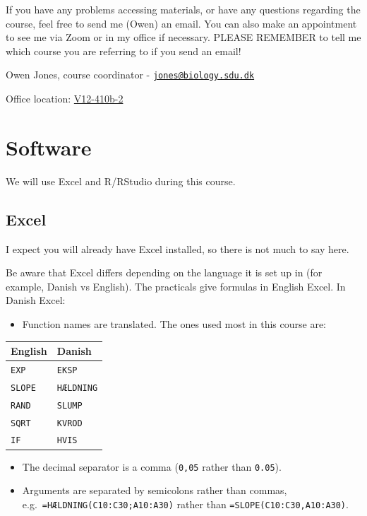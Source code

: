 \documentclass[
  a4paper]{book}
\newcounter{none} %
\providecommand{\tightlist}{%
  \setlength{\itemsep}{0pt}\setlength{\parskip}{0pt}}
\begin{document}
If you have any problems accessing materials, or have any questions regarding the course, feel free to send me (Owen) an email. You can also make an appointment to see me via Zoom or in my office if necessary. PLEASE REMEMBER to tell me which course you are referring to if you send an email!

Owen Jones, course coordinator - \href{mailto:jones@biology.sdu.dk}{\nolinkurl{jones@biology.sdu.dk}}

Office location: \href{https://clients.mapsindoors.com/sdu/573f26e4bc1f571b08094312/details/563cb94f423b7d0540c9a605}{V12-410b-2}

\section{Software}\label{software}

We will use Excel and R/RStudio during this course.

\subsection{Excel}\label{excel}

I expect you will already have Excel installed, so there is not much to say here.

Be aware that Excel differs depending on the language it is set up in (for example, Danish vs English). The practicals give formulas in English Excel. In Danish Excel:

\begin{itemize}
\tightlist
\item
  Function names are translated. The ones used most in this course are:
\end{itemize}

{\def\LTcaptype{none} %
\begin{longtable}[]{@{}ll@{}}
\toprule\noalign{}
English & Danish \\
\midrule\noalign{}
\endhead
\bottomrule\noalign{}
\endlastfoot
\texttt{EXP} & \texttt{EKSP} \\
\texttt{SLOPE} & \texttt{HÆLDNING} \\
\texttt{RAND} & \texttt{SLUMP} \\
\texttt{SQRT} & \texttt{KVROD} \\
\texttt{IF} & \texttt{HVIS} \\
\end{longtable}
}

\begin{itemize}
\tightlist
\item
  The decimal separator is a comma (\texttt{0,05} rather than \texttt{0.05}).
\item
  Arguments are separated by semicolons rather than commas, e.g.~\texttt{=HÆLDNING(C10:C30;A10:A30)} rather than \texttt{=SLOPE(C10:C30,A10:A30)}.
\end{itemize}
\end{document}
